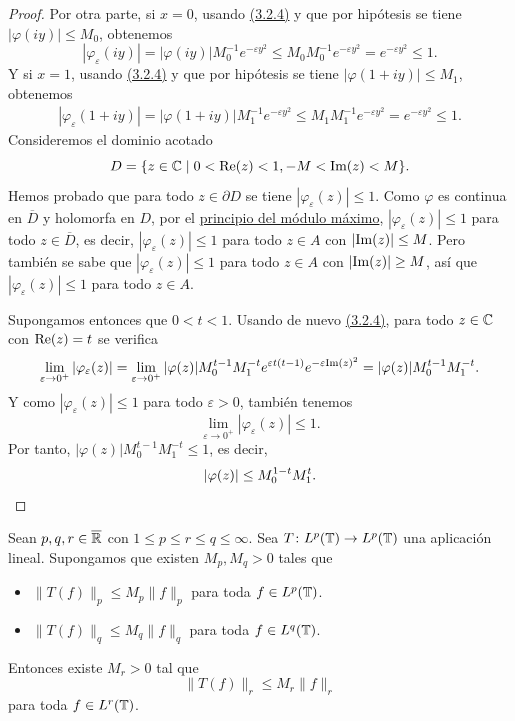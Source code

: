 \documentclass[a4paper, 12pt, oneside]{book}
\begin{document}
\begin{proof}
    Por otra parte, si $x = 0$, usando \hyperref[3.2.4]{\color{blue}(3.2.4)} y que por hipótesis se tiene $|\varphi(iy)| \leq M_0$, obtenemos
    \[|\varphi_\varepsilon(iy)| = |\varphi(iy)|M_0^{-1}e^{-\varepsilon y^2} \leq M_0M_0^{-1}e^{-\varepsilon y^2} = e^{-\varepsilon y^2} \leq 1.\]
    Y si $x = 1$, usando \hyperref[3.2.4]{\color{blue}(3.2.4)} y que por hipótesis se tiene $|\varphi(1+iy)| \leq M_1$, obtenemos
    \begin{align*}
        |\varphi_\varepsilon(1+iy)| = |\varphi(1+iy)|M_1^{-1}e^{-\varepsilon y^2} \leq M_1M_1^{-1}e^{-\varepsilon y^2} = e^{-\varepsilon y^2} \leq 1.
    \end{align*}
    Consideremos el dominio acotado 
    \[D = \{z \in \mathbb C \mid 0 < \textup{Re}(z) < 1, -M < \textup{Im}(z) < M\}.\]
    Hemos probado que para todo $z \in \partial D$ se tiene $|\varphi_\varepsilon(z)| \leq 1$. Como $\varphi$ es continua en $\overline{D}$ y holomorfa en $D$, por el \hyperref[1.2.12]{\color{blue}principio del módulo máximo}, $|\varphi_\varepsilon(z)| \leq 1$ para todo $z \in \overline{D}$, es decir, $|\varphi_\varepsilon(z)| \leq 1$ para todo $z \in A$ con $|\textup{Im}(z)| \leq M$. Pero también se sabe que $|\varphi_\varepsilon(z)| \leq 1$ para todo $z \in A$ con $|\textup{Im}(z)| \geq M$, así que $|\varphi_\varepsilon(z)| \leq 1$ para todo $z \in A$.

    Supongamos entonces que $0 < t < 1$. Usando de nuevo \hyperref[3.2.4]{\color{blue}(3.2.4)}, para todo $z \in \mathbb C$ con $\textup{Re}(z) = t$ se verifica
    \[\lim_{\varepsilon \to 0^+} |\varphi_\varepsilon(z)| = \lim_{\varepsilon \to 0^+}  |\varphi(z)|M_0^{t-1}M_1^{-t}e^{\varepsilon t(t-1)}e^{-\varepsilon \textup{Im}(z)^2} = |\varphi(z)|M_0^{t-1}M_1^{-t}.\]
    Y como $|\varphi_\varepsilon(z)| \leq 1$ para todo $\varepsilon > 0$, también tenemos
    \[\lim_{\varepsilon \to 0^+} |\varphi_\varepsilon(z)| \leq 1.\]
    Por tanto, $|\varphi(z)| M_0^{t-1}M_1^{-t} \leq 1$, es decir,
    \[|\varphi(z)| \leq M_0^{1-t}M_1^t. \qedhere\]
\end{proof}

\begin{theorem}\label{3.2.2}
    Sean $p,q,r\in\overline{\mathbb R}$ con $1 \leq p \leq r \leq q \leq \infty$. Sea $T \colon L^{p}(\mathbb T) \to L^{p}(\mathbb T)$ una aplicación lineal. Supongamos que existen $M_p,M_q>0$ tales que
    \begin{itemize}
        \item $\|T(f)\|_{p} \leq M_p\|f\|_{p}$ para toda $f \in L^{p}(\mathbb T)$.
        \item $\|T(f)\|_{q} \leq M_q\|f\|_{q}$ para toda $f \in L^{q}(\mathbb T)$.
    \end{itemize}
    Entonces existe $M_r>0$ tal que
    \[\|T(f)\|_r \leq M_r\|f\|_r\]
    para toda $f \in L^r(\mathbb T)$.
\end{theorem}
\end{document}
